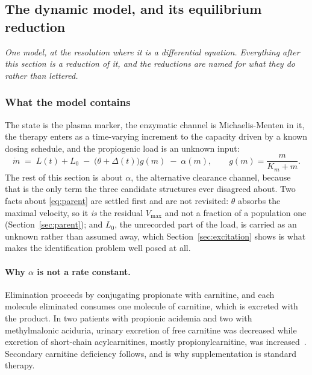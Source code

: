 \subsection{The dynamic model, and its equilibrium reduction}
\label{sec:dynamic}

\emph{One model, at the resolution where it is a differential equation. Everything after
this section is a reduction of it, and the reductions are named for what they do rather
than lettered.}

\subsubsection{What the model contains}
\label{sec:model_C_added}

The state is the plasma marker, the enzymatic channel is Michaelis-Menten in it, the therapy
enters as a time-varying increment to the capacity driven by a known dosing schedule, and
the propiogenic load is an unknown input:
\begin{equation}
\dot m \;=\; L(t) + L_0 \;-\; \bigl(\theta + \Delta(t)\bigr) g(m) \;-\; \alpha(m),
\qquad g(m) = \frac{m}{K_m+m}.
\label{eq:parent_orig}
\end{equation}
The rest of this section is about $\alpha$, the alternative clearance channel, because that
is the only term the three candidate structures ever disagreed about. Two facts about
\eqref{eq:parent} are settled first and are not revisited: $\theta$ absorbs the maximal
velocity, so it \emph{is} the residual $V_{\max}$ and not a fraction of a population one
(Section~\ref{sec:parent}); and $L_0$, the unrecorded part of the load, is carried as an
unknown rather than assumed away, which Section~\ref{sec:excitation} shows is what makes
the identification problem well posed at all.

\paragraph{Why $\alpha$ is not a rate constant.} Elimination proceeds by
conjugating propionate with carnitine, and each molecule eliminated consumes one
molecule of carnitine, which is excreted with the product. In two patients with propionic
acidemia and two with methylmalonic aciduria, urinary excretion of free carnitine was
decreased while excretion of short-chain acylcarnitines, mostly propionylcarnitine, was
increased~\cite{carnitine_excretion_pa}. %
Secondary carnitine deficiency follows, and is why supplementation is standard therapy.

